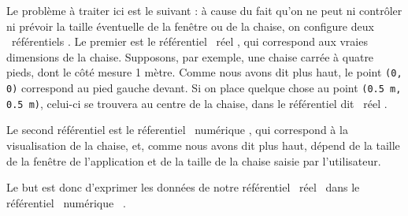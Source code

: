 \documentclass{polytech/polytech}
\begin{document}
Le problème à traiter ici est le suivant : à cause du fait qu'on ne peut ni contrôler ni prévoir la taille éventuelle de la fenêtre ou de la chaise, on configure deux \guillemotleft\ référentiels \guillemotright . 
Le premier est le référentiel \guillemotleft\ réel \guillemotright , qui correspond aux vraies dimensions de la chaise. Supposons, par exemple, une chaise carrée à quatre pieds, dont le côté mesure 1 mètre. Comme nous avons dit plus haut, le point \texttt{(0, 0)} correspond au pied gauche devant. Si on place quelque chose au point \texttt{(0.5 m, 0.5 m)}, celui-ci se trouvera au centre de la chaise, dans le référentiel dit \guillemotleft\ réel \guillemotright . 

Le second référentiel est le réferentiel \guillemotleft\ numérique \guillemotright , qui correspond à la visualisation de la chaise, et, comme nous avons dit plus haut, dépend de la taille de la fenêtre de l'application et de la taille de la chaise saisie par l'utilisateur. 

Le but est donc d’exprimer les données de notre référentiel \guillemotleft\ réel \guillemotright\ dans le référentiel \guillemotleft\ numérique \guillemotright\ .
\end{document}
